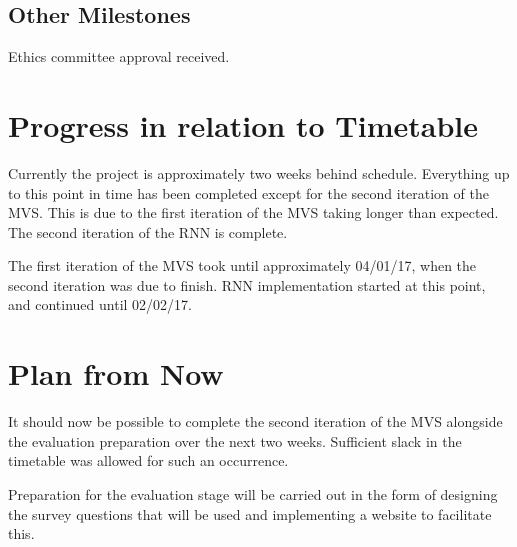 \documentclass[12pt,a4paper,twoside]{article}
\begin{document}
\subsection*{Other Milestones}

Ethics committee approval received.

\section*{Progress in relation to Timetable}

Currently the project is approximately two weeks behind schedule. Everything up
to this point in time has been completed except for the second iteration of the
MVS. This is due to the first iteration of the MVS taking longer than expected.
The second iteration of the RNN is complete. 

The first iteration of the MVS took until approximately 04/01/17, when the
second iteration was due to finish. RNN implementation started at this point,
and continued until 02/02/17.

\section*{Plan from Now}

It should now be possible to complete the second iteration of the MVS alongside
the evaluation preparation over the next two weeks. Sufficient slack in the
timetable was allowed for such an occurrence.

Preparation for the evaluation stage will be carried out in the form of
designing the survey questions that will be used and implementing a website to
facilitate this.
\end{document}
